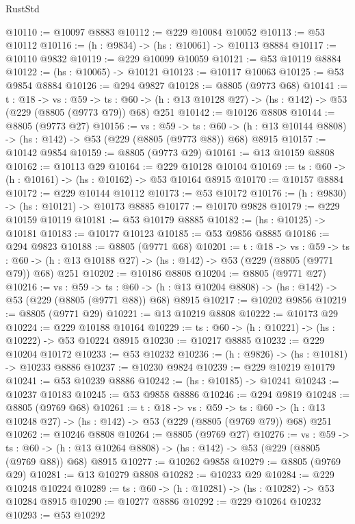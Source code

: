 \begin{lexlean}{RustStd}
\begin{coremodule}
@10110 := @10097 @8883
@10112 := @229 @10084 @10052
@10113 := @53 @10112
@10116 := (h : @9834) -> (hs : @10061) -> @10113 @8884
@10117 := @10110 @9832
@10119 := @229 @10099 @10059
@10121 := @53 @10119 @8884
@10122 := (hs : @10065) -> @10121
@10123 := @10117 @10063
@10125 := @53 @9854 @8884
@10126 := @294 @9827
@10128 := @8805 (@9773 @68)
@10141 := {t : @18} ->
  {vs : @59} ->
  {ts : @60} -> (h : @13 @10128 @27) -> (hs : @142) -> @53 (@229 (@8805 (@9773 @79)) @68) @251
@10142 := @10126 @8808
@10144 := @8805 (@9773 @27)
@10156 := {vs : @59} ->
  {ts : @60} -> (h : @13 @10144 @8808) -> (hs : @142) -> @53 (@229 (@8805 (@9773 @88)) @68) @8915
@10157 := @10142 @9854
@10159 := @8805 (@9773 @29)
@10161 := @13 @10159 @8808
@10162 := @10113 @29
@10164 := @229 @10128 @10104
@10169 := {ts : @60} -> (h : @10161) -> (hs : @10162) -> @53 @10164 @8915
@10170 := @10157 @8884
@10172 := @229 @10144 @10112
@10173 := @53 @10172
@10176 := (h : @9830) -> (hs : @10121) -> @10173 @8885
@10177 := @10170 @9828
@10179 := @229 @10159 @10119
@10181 := @53 @10179 @8885
@10182 := (hs : @10125) -> @10181
@10183 := @10177 @10123
@10185 := @53 @9856 @8885
@10186 := @294 @9823
@10188 := @8805 (@9771 @68)
@10201 := {t : @18} ->
  {vs : @59} ->
  {ts : @60} -> (h : @13 @10188 @27) -> (hs : @142) -> @53 (@229 (@8805 (@9771 @79)) @68) @251
@10202 := @10186 @8808
@10204 := @8805 (@9771 @27)
@10216 := {vs : @59} ->
  {ts : @60} -> (h : @13 @10204 @8808) -> (hs : @142) -> @53 (@229 (@8805 (@9771 @88)) @68) @8915
@10217 := @10202 @9856
@10219 := @8805 (@9771 @29)
@10221 := @13 @10219 @8808
@10222 := @10173 @29
@10224 := @229 @10188 @10164
@10229 := {ts : @60} -> (h : @10221) -> (hs : @10222) -> @53 @10224 @8915
@10230 := @10217 @8885
@10232 := @229 @10204 @10172
@10233 := @53 @10232
@10236 := (h : @9826) -> (hs : @10181) -> @10233 @8886
@10237 := @10230 @9824
@10239 := @229 @10219 @10179
@10241 := @53 @10239 @8886
@10242 := (hs : @10185) -> @10241
@10243 := @10237 @10183
@10245 := @53 @9858 @8886
@10246 := @294 @9819
@10248 := @8805 (@9769 @68)
@10261 := {t : @18} ->
  {vs : @59} ->
  {ts : @60} -> (h : @13 @10248 @27) -> (hs : @142) -> @53 (@229 (@8805 (@9769 @79)) @68) @251
@10262 := @10246 @8808
@10264 := @8805 (@9769 @27)
@10276 := {vs : @59} ->
  {ts : @60} -> (h : @13 @10264 @8808) -> (hs : @142) -> @53 (@229 (@8805 (@9769 @88)) @68) @8915
@10277 := @10262 @9858
@10279 := @8805 (@9769 @29)
@10281 := @13 @10279 @8808
@10282 := @10233 @29
@10284 := @229 @10248 @10224
@10289 := {ts : @60} -> (h : @10281) -> (hs : @10282) -> @53 @10284 @8915
@10290 := @10277 @8886
@10292 := @229 @10264 @10232
@10293 := @53 @10292

\end{coremodule}
\end{lexlean}

